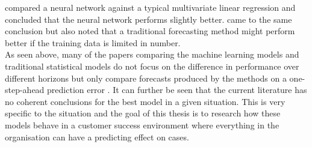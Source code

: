 \cite{Comrie2012ComparingForecasting} compared a neural network against a typical multivariate linear regression and concluded that the neural network performs slightly better. \cite{Mitrea2009AStudy} came to the same conclusion but also noted that a traditional forecasting method might perform better if the training data is limited in number.\\


As seen above, many of the papers comparing the machine learning models and traditional statistical models do not focus on the difference in performance over different horizons but only compare forecasts produced by the methods on a one-step-ahead prediction error \citep{Rafael2019EvaluationModel}. It can further be seen that the current literature has no coherent conclusions for the best model in a given situation. This is very specific to the situation and the goal of this thesis is to research how these models behave in a customer success environment where everything in the organisation can have a predicting effect on cases. 